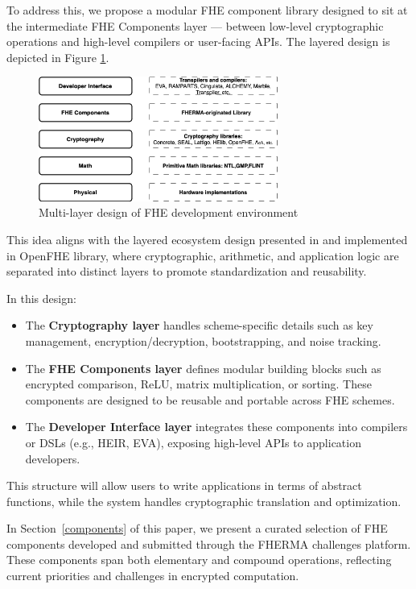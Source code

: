 \documentclass[article]{iacrtrans}
\begin{document}
To address this, we propose a modular FHE component library designed to sit at the intermediate FHE Components layer --- between low-level cryptographic operations and high-level compilers or user-facing APIs. The layered design is depicted in Figure \ref{fig:fhe_layers}. 

        \begin{figure}[H]
            \centering
            \includegraphics[width=0.7\textwidth]{fhe_layers.png}
            \caption{Multi-layer design of FHE development environment
}
            \label{fig:fhe_layers}
        \end{figure}

This idea aligns with the layered ecosystem design presented in \cite{openfhe:2022/915} and implemented in OpenFHE library, where cryptographic, arithmetic, and application logic are separated into distinct layers to promote standardization and reusability.

In this design:

\begin{itemize}
    \item The \textbf{Cryptography layer} handles scheme-specific details such as key management, encryption/decryption, bootstrapping, and noise tracking.
    \item The \textbf{FHE Components layer} defines modular building blocks such as encrypted comparison, ReLU, matrix multiplication, or sorting. These components are designed to be reusable and portable across FHE schemes.
    \item The \textbf{Developer Interface layer} integrates these components into compilers or DSLs (e.g., HEIR, EVA), exposing high-level APIs to application developers.
\end{itemize}

This structure will allow users to write applications in terms of abstract functions, while the system handles cryptographic translation and optimization.

In Section~\ref{components} of this paper, we present a curated selection of FHE components developed and submitted through the FHERMA challenges platform. These components span both elementary and compound operations, reflecting current priorities and challenges in encrypted computation.
\end{document}
